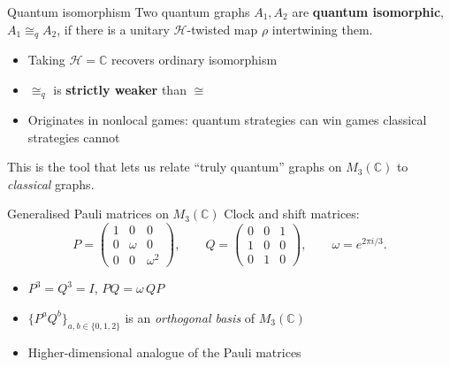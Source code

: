 \documentclass[aspectratio=169]{beamer}
\begin{document}
\begin{frame}{Quantum isomorphism}
    Two quantum graphs $A_1, A_2$ are \textbf{quantum isomorphic},
    $A_1 \cong_q A_2$, if there is a unitary
    $\mathcal{H}$-twisted map $\rho$ intertwining them.
    \begin{itemize}
        \item Taking $\mathcal{H} = \mathbb{C}$ recovers ordinary isomorphism
        \item $\cong_q$ is \textbf{strictly weaker} than $\cong$
        \item Originates in nonlocal games: quantum strategies can win games
            classical strategies cannot
    \end{itemize}
    \vspace{0.5em}
    This is the tool that lets us relate ``truly quantum'' graphs on
    $M_3 (\mathbb{C})$
    to \emph{classical} graphs.
\end{frame}

\begin{frame}{Generalised Pauli matrices on $M_3 (\mathbb{C})$}
    Clock and shift matrices:
    \[
        P =
        \begin{pmatrix} 1 & 0 & 0 \\ 0 & \omega & 0 \\ 0 & 0 & \omega^2
        \end{pmatrix},
        \qquad
        Q =
        \begin{pmatrix} 0 & 0 & 1 \\ 1 & 0 & 0 \\ 0 & 1 & 0
        \end{pmatrix},
        \qquad \omega = e^{2\pi i/3}.
    \]
    \begin{itemize}
        \item $P^3 = Q^3 = I$, \quad $PQ = \omega\, QP$
        \item $\{P^aQ^b\}_{a,b\in\{0,1,2\}}$ is an \emph{orthogonal basis}
            of $M_3 (\mathbb{C})$
        \item Higher-dimensional analogue of the Pauli matrices
    \end{itemize}
\end{frame}
\end{document}
